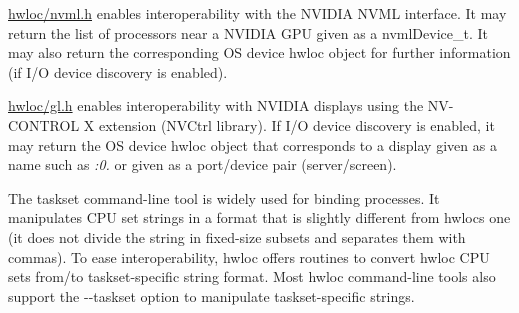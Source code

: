 \begin{DoxyDescription}
\item[N\+V\+I\+D\+IA Management Library (N\+V\+ML) ]\hyperlink{a00158_source}{hwloc/nvml.\+h} enables interoperability with the N\+V\+I\+D\+IA N\+V\+ML interface. It may return the list of processors near a N\+V\+I\+D\+IA G\+PU given as a {\ttfamily nvml\+Device\+\_\+t}. It may also return the corresponding OS device hwloc object for further information (if I/O device discovery is enabled). 


\item[N\+V\+I\+D\+IA displays ]\hyperlink{a00164_source}{hwloc/gl.\+h} enables interoperability with N\+V\+I\+D\+IA displays using the N\+V-\/\+C\+O\+N\+T\+R\+OL X extension (N\+V\+Ctrl library). If I/O device discovery is enabled, it may return the OS device hwloc object that corresponds to a display given as a name such as {\itshape \+:0.} or given as a port/device pair (server/screen). 


\item[Taskset command-\/line tool ]The taskset command-\/line tool is widely used for binding processes. It manipulates C\+PU set strings in a format that is slightly different from hwloc\textquotesingle{}s one (it does not divide the string in fixed-\/size subsets and separates them with commas). To ease interoperability, hwloc offers routines to convert hwloc C\+PU sets from/to taskset-\/specific string format. Most hwloc command-\/line tools also support the {\ttfamily -\/-\/taskset} option to manipulate taskset-\/specific strings. 


\end{DoxyDescription}
